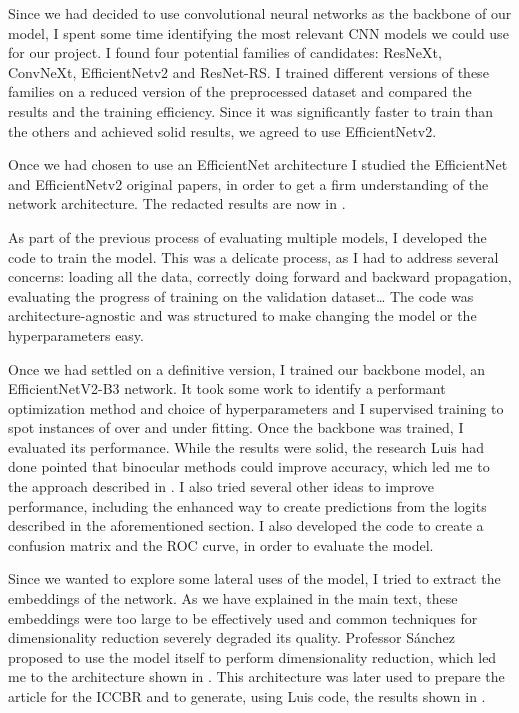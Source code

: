 Since we had decided to use convolutional neural networks as the backbone of our model, I spent some time identifying the most relevant CNN models we could use for our project. I found four potential families of candidates: ResNeXt, ConvNeXt, EfficientNetv2 and ResNet-RS. I trained different versions of these families on a reduced version of the preprocessed dataset and compared the results and the training efficiency. Since it was significantly faster to train than the others and achieved solid results, we agreed to use EfficientNetv2.

Once we had chosen to use an EfficientNet architecture I studied the EfficientNet and EfficientNetv2 original papers, in order to get a firm understanding of the network architecture. The redacted results are now in . 

As part of the previous process of evaluating multiple models, I developed the code to train the model. This was a delicate process, as I had to address several concerns: loading all the data, correctly doing forward and backward propagation, evaluating the progress of training on the validation dataset… The code was architecture-agnostic and was structured to make changing the model or the hyperparameters easy. 

Once we had settled on a definitive version, I trained our backbone model, an EfficientNetV2-B3 network. It took some work to identify a performant optimization method and choice of hyperparameters and I supervised training to spot instances of over and under fitting. Once the backbone was trained, I evaluated its performance. While the results were solid, the research Luis had done pointed that binocular methods could improve accuracy, which led me to the approach described in . I also tried several other ideas to improve performance, including the enhanced way to create predictions from the logits described in the aforementioned section. I also developed the code to create a confusion matrix and the ROC curve, in order to evaluate the model.

Since we wanted to explore some lateral uses of the model, I tried to extract the embeddings of the network. As we have explained in the main text, these embeddings were too large to be effectively used and common techniques for dimensionality reduction severely degraded its quality. Professor Sánchez proposed to use the model itself to perform dimensionality reduction, which led me to the architecture shown in . This architecture was later used to prepare the article for the ICCBR and to generate, using Luis code, the results shown in .

